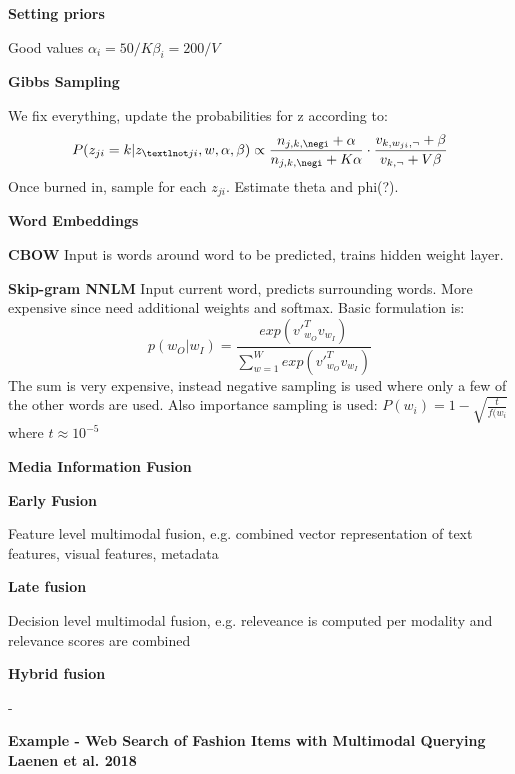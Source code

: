 \documentclass[a4paper,10pt,landscape]{article}
\begin{document}
\begin{multicols}{3}
\textbf{Setting priors}

Good values $\alpha_i = 50/K \beta_i=200/V$

\textbf{Gibbs Sampling}

We fix everything, update the probabilities for z according to:
\begin{equation*}
    P(z_{ji}=k|z_{¬ji},w,\alpha,\beta)\propto \frac{n_{j,k,\negi}+\alpha}{n_{j,k,\negi}+K\alpha}\cdot\frac{v_{k,w_{ji},\neg}+\beta}{v_{k,\neg}+V\beta}
\end{equation*}
Once burned in, sample for each $z_{ji}$. Estimate theta and phi(?).

\begin{center}
{\Large \textbf{Word Embeddings} \par}
\end{center}

\textbf{CBOW}
Input is words around word to be predicted, trains hidden weight layer.

\textbf{Skip-gram NNLM}
Input current word, predicts surrounding words.
More expensive since need additional weights and softmax.
Basic formulation is:
\begin{equation*}
    p(w_O|w_I) = \frac{exp(v'_{w_O}^Tv_{w_I})}{\sum_{w=1}^{W}exp(v'_{w_O}^Tv_{w_I})}
\end{equation*}
The sum is very expensive, instead negative sampling is used where only a few of the other words are used. Also importance sampling is used: $P(w_i)=1-\sqrt{\frac{t}{f(w_i}}$ where $t\approx10^{-5}$
\vspace{18mm} 
\begin{center}
{\Large \textbf{Media Information Fusion} \par}
\end{center}

\textbf{Early Fusion}

Feature level multimodal fusion, e.g. combined vector representation of text features, visual features, metadata

\textbf{Late fusion}

Decision level multimodal fusion, e.g. releveance is computed per modality and relevance scores are combined

\textbf{Hybrid fusion}

-

\textbf{Example - Web Search of Fashion Items with Multimodal Querying Laenen et al. 2018}


\end{multicols}
\end{document}
